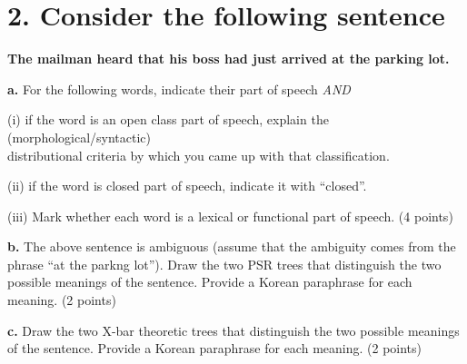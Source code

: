 \documentclass{article}
\begin{document}
\section{2. Consider the following sentence \normalsize}
\begin{center}
     \textbf{The mailman heard that his boss had just arrived at the parking lot.} \par
\end{center}
\bigskip
\noindent \textbf{a.} For the following words, indicate their part of speech \textit{AND} \par
\medskip \noindent (i) if the word is an open class part of speech, explain the (morphological/syntactic)\\ distributional criteria by which you came up with that classification.\par
\vspace{1em}
\noindent (ii) if the word is closed part of speech, indicate it with ``closed''.\par
\vspace{1em}
\noindent (iii) Mark whether each word is a lexical or functional part of speech. (4 points) \par
\vspace{2em}
\begin{description}
    \setlength{\itemsep}{2em}
    \item[\textbf{The}] 
    \item[\textbf{mailman}] 
    \item[\textbf{heard}]
    \item[\textbf{that}]
    \item[\textbf{his}]
    \item[\textbf{had}]
    \item[\textbf{at}]
    \item[\textbf{parking}]
\end{description}

\newpage
\noindent \textbf{b.} The above sentence is ambiguous (assume that the ambiguity comes from the phrase ``at the parkng lot''). Draw the two PSR trees that distinguish the two possible meanings of the sentence. Provide a Korean paraphrase for each meaning. (2 points) \par
\vspace{10cm}
\null\vfill

\newpage
\noindent \textbf{c.} Draw the two X-bar theoretic trees that distinguish the two possible meanings of the sentence. Provide a Korean paraphrase for each meaning. (2 points)
\vspace{10cm}
\null\vfill
\end{document}
